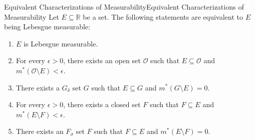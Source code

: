 \documentclass[../main.tex]{subfiles}
\begin{document}
\begin{theorem}{Equivalent Characterizations of Measurability}{Equivalent Characterizations of Measurability}
  Let $E \subseteq \mathbb{R}$ be a set. The following statements are equivalent to $E$ being Lebesgue measurable:
  \begin{enumerate}
    \item $E$ is Lebesgue measurable.
    \item For every $\epsilon > 0$, there exists an open set $\mathcal{O}$ such that $E \subseteq \mathcal{O}$ and $m^*(\mathcal{O} \setminus E) < \epsilon$.
    \item There exists a $G_\delta$ set $G$ such that $E \subseteq G$ and $m^*(G \setminus E) = 0$.
    \item For every $\epsilon > 0$, there exists a closed set $F$ such that $F \subseteq E$ and $m^*(E \setminus F) < \epsilon$.
    \item There exists an $F_\sigma$ set $F$ such that $F \subseteq E$ and $m^*(E \setminus F) = 0$.
  \end{enumerate}
\end{theorem}
\end{document}
